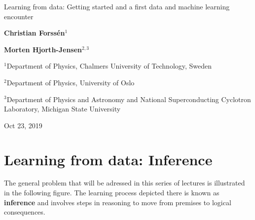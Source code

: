 \documentclass[%
oneside,                 %
final,                   %
10pt]{article}
\begin{document}

\newcommand{\exercisesection}[1]{\subsection*{#1}}







\thispagestyle{empty}

\begin{center}
{\LARGE\bf
\begin{spacing}{1.25}
Learning from data: Getting started and a first data and machine learning encounter
\end{spacing}
}
\end{center}


\begin{center}
{\bf Christian Forssén${}^{1}$} \\ [0mm]
\end{center}


\begin{center}
{\bf Morten Hjorth-Jensen${}^{2, 3}$} \\ [0mm]
\end{center}

\begin{center}
\centerline{{\small ${}^1$Department of Physics, Chalmers University of Technology, Sweden}}
\centerline{{\small ${}^2$Department of Physics, University of Oslo}}
\centerline{{\small ${}^3$Department of Physics and Astronomy and National Superconducting Cyclotron Laboratory, Michigan State University}}
\end{center}
    

\begin{center}
Oct 23, 2019
\end{center}

\vspace{1cm}


\section{Learning from data: Inference}
The general problem that will be adressed in this series of lectures is illustrated in the following figure. The learning process depicted there is known as \textbf{inference} and involves steps in reasoning to move from premises to logical consequences. 
\end{document}
